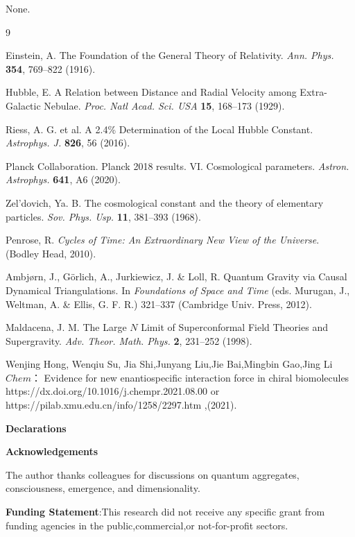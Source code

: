 \documentclass[12pt,a4paper]{article}
\begin{document}
None.

\begin{thebibliography}{9}

Einstein, A. The Foundation of the General Theory of Relativity. \textit{Ann. Phys.} \textbf{354}, 769--822 (1916).

Hubble, E. A Relation between Distance and Radial Velocity among Extra-Galactic Nebulae. \textit{Proc. Natl Acad. Sci. USA} \textbf{15}, 168--173 (1929).

Riess, A. G. et al. A 2.4\% Determination of the Local Hubble Constant. \textit{Astrophys. J.} \textbf{826}, 56 (2016).

Planck Collaboration. Planck 2018 results. VI. Cosmological parameters. \textit{Astron. Astrophys.} \textbf{641}, A6 (2020).

Zel'dovich, Ya. B. The cosmological constant and the theory of elementary particles. \textit{Sov. Phys. Usp.} \textbf{11}, 381--393 (1968).

Penrose, R. \textit{Cycles of Time: An Extraordinary New View of the Universe}. (Bodley Head, 2010).

Ambj{\o}rn, J., G{\"o}rlich, A., Jurkiewicz, J. \& Loll, R. Quantum Gravity via Causal Dynamical Triangulations. In \textit{Foundations of Space and Time} (eds. Murugan, J., Weltman, A. \& Ellis, G. F. R.) 321--337 (Cambridge Univ. Press, 2012).

Maldacena, J. M. The Large $N$ Limit of Superconformal Field Theories and Supergravity. \textit{Adv. Theor. Math. Phys.} \textbf{2}, 231--252 (1998).


\bibitem{}Wenjing  Hong, Wenqiu Su, Jia Shi,Junyang Liu,Jie Bai,Mingbin Gao,Jing Li   $Chem：$ Evidence for new enantiospecific interaction force in chiral biomolecules  https://dx.doi.org/10.1016/j.chempr.2021.08.00 or https://pilab.xmu.edu.cn/info/1258/2297.htm \textbf{},(2021).


\end{thebibliography}
\textbf{\textbf{Declarations}}

  \textbf{\textbf{Acknowledgements}}

The author thanks colleagues for discussions on quantum aggregates, consciousness, emergence, and dimensionality. 

 \textbf{\textbf{Funding Statement}}:This research did not receive any specific grant from funding agencies in the public,commercial,or not-for-profit sectors.
\end{document}
